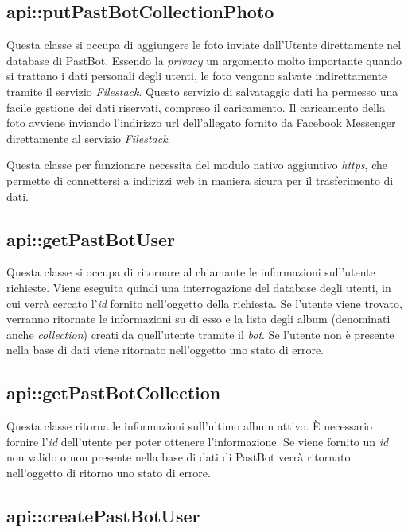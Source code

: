\subsection{api::putPastBotCollectionPhoto}

Questa classe si occupa di aggiungere le foto inviate dall'Utente direttamente
nel database di PastBot. Essendo la \textit{privacy} un argomento molto
importante quando si trattano i dati personali degli utenti, le foto vengono
salvate indirettamente tramite il servizio \textit{Filestack}. Questo
servizio di salvataggio dati ha permesso una facile gestione dei dati
riservati, compreso il caricamento. Il caricamento della foto avviene inviando
l'indirizzo \gls{url} dell'allegato fornito da Facebook Messenger direttamente
al servizio \textit{Filestack}.


Questa classe per funzionare necessita del modulo nativo aggiuntivo
\textit{https}, che permette di connettersi a indirizzi web in maniera sicura
per il trasferimento di dati.

\subsection{api::getPastBotUser}

Questa classe si occupa di ritornare al chiamante le informazioni sull'utente
richieste. Viene eseguita quindi una interrogazione del database degli utenti,
in cui verrà cercato l'\textit{id} fornito nell'oggetto della richiesta. Se
l'utente viene trovato, verranno ritornate le informazioni su di esso e la
lista degli album (denominati anche \textit{collection}) creati da quell'utente
tramite il \textit{bot}.
Se l'utente non è presente nella base di dati viene ritornato nell'oggetto uno
stato di errore.

\subsection{api::getPastBotCollection}

Questa classe ritorna le informazioni sull'ultimo album attivo. È necessario
fornire l'\textit{id} dell'utente per poter ottenere l'informazione.
Se viene fornito un \textit{id} non valido o non presente nella base di dati di
PastBot verrà ritornato nell'oggetto di ritorno uno stato di errore.

\subsection{api::createPastBotUser}


